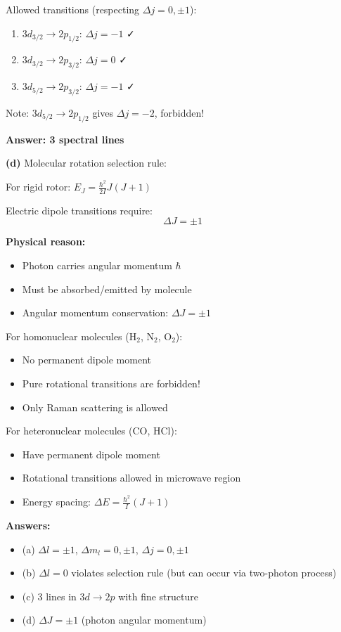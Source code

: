\documentclass[12pt,a4paper]{article}
\begin{document}
\begin{solution}
Allowed transitions (respecting $\Delta j = 0, \pm 1$):
\begin{enumerate}
    \item $3d_{3/2} \to 2p_{1/2}$: $\Delta j = -1$ ✓
    \item $3d_{3/2} \to 2p_{3/2}$: $\Delta j = 0$ ✓
    \item $3d_{5/2} \to 2p_{3/2}$: $\Delta j = -1$ ✓
\end{enumerate}

Note: $3d_{5/2} \to 2p_{1/2}$ gives $\Delta j = -2$, forbidden!

\textbf{Answer: 3 spectral lines}

\textbf{(d)} Molecular rotation selection rule:

For rigid rotor: $E_J = \frac{\hbar^2}{2I}J(J+1)$

Electric dipole transitions require:
$$\Delta J = \pm 1$$

\textbf{Physical reason:}
\begin{itemize}
    \item Photon carries angular momentum $\hbar$
    \item Must be absorbed/emitted by molecule
    \item Angular momentum conservation: $\Delta J = \pm 1$
\end{itemize}

For homonuclear molecules (H$_2$, N$_2$, O$_2$):
\begin{itemize}
    \item No permanent dipole moment
    \item Pure rotational transitions are forbidden!
    \item Only Raman scattering is allowed
\end{itemize}

For heteronuclear molecules (CO, HCl):
\begin{itemize}
    \item Have permanent dipole moment
    \item Rotational transitions allowed in microwave region
    \item Energy spacing: $\Delta E = \frac{\hbar^2}{I}(J+1)$
\end{itemize}

\textbf{Answers:}
\begin{itemize}
    \item (a) $\Delta l = \pm 1$, $\Delta m_l = 0, \pm 1$, $\Delta j = 0, \pm 1$
    \item (b) $\Delta l = 0$ violates selection rule (but can occur via two-photon process)
    \item (c) 3 lines in $3d \to 2p$ with fine structure
    \item (d) $\Delta J = \pm 1$ (photon angular momentum)
\end{itemize}
\end{solution}
\end{document}
